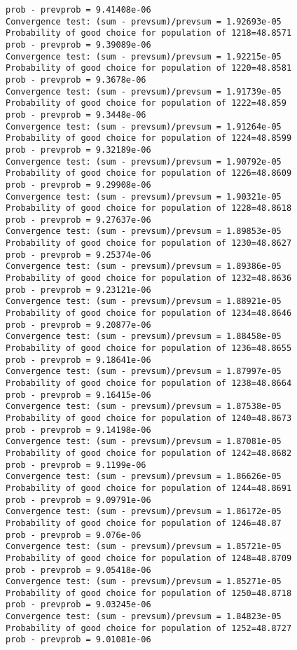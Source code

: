 \documentclass[11pt,onecolumn]{article}
\begin{document}
\begin{verbatim}
prob - prevprob = 9.41408e-06
Convergence test: (sum - prevsum)/prevsum = 1.92693e-05
Probability of good choice for population of 1218=48.8571
prob - prevprob = 9.39089e-06
Convergence test: (sum - prevsum)/prevsum = 1.92215e-05
Probability of good choice for population of 1220=48.8581
prob - prevprob = 9.3678e-06
Convergence test: (sum - prevsum)/prevsum = 1.91739e-05
Probability of good choice for population of 1222=48.859
prob - prevprob = 9.3448e-06
Convergence test: (sum - prevsum)/prevsum = 1.91264e-05
Probability of good choice for population of 1224=48.8599
prob - prevprob = 9.32189e-06
Convergence test: (sum - prevsum)/prevsum = 1.90792e-05
Probability of good choice for population of 1226=48.8609
prob - prevprob = 9.29908e-06
Convergence test: (sum - prevsum)/prevsum = 1.90321e-05
Probability of good choice for population of 1228=48.8618
prob - prevprob = 9.27637e-06
Convergence test: (sum - prevsum)/prevsum = 1.89853e-05
Probability of good choice for population of 1230=48.8627
prob - prevprob = 9.25374e-06
Convergence test: (sum - prevsum)/prevsum = 1.89386e-05
Probability of good choice for population of 1232=48.8636
prob - prevprob = 9.23121e-06
Convergence test: (sum - prevsum)/prevsum = 1.88921e-05
Probability of good choice for population of 1234=48.8646
prob - prevprob = 9.20877e-06
Convergence test: (sum - prevsum)/prevsum = 1.88458e-05
Probability of good choice for population of 1236=48.8655
prob - prevprob = 9.18641e-06
Convergence test: (sum - prevsum)/prevsum = 1.87997e-05
Probability of good choice for population of 1238=48.8664
prob - prevprob = 9.16415e-06
Convergence test: (sum - prevsum)/prevsum = 1.87538e-05
Probability of good choice for population of 1240=48.8673
prob - prevprob = 9.14198e-06
Convergence test: (sum - prevsum)/prevsum = 1.87081e-05
Probability of good choice for population of 1242=48.8682
prob - prevprob = 9.1199e-06
Convergence test: (sum - prevsum)/prevsum = 1.86626e-05
Probability of good choice for population of 1244=48.8691
prob - prevprob = 9.09791e-06
Convergence test: (sum - prevsum)/prevsum = 1.86172e-05
Probability of good choice for population of 1246=48.87
prob - prevprob = 9.076e-06
Convergence test: (sum - prevsum)/prevsum = 1.85721e-05
Probability of good choice for population of 1248=48.8709
prob - prevprob = 9.05418e-06
Convergence test: (sum - prevsum)/prevsum = 1.85271e-05
Probability of good choice for population of 1250=48.8718
prob - prevprob = 9.03245e-06
Convergence test: (sum - prevsum)/prevsum = 1.84823e-05
Probability of good choice for population of 1252=48.8727
prob - prevprob = 9.01081e-06

\end{verbatim}
\end{document}

